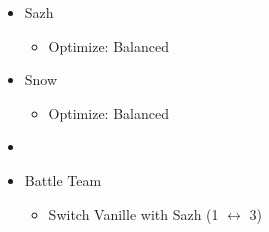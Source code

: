 \begin{menu}
\begin{itemize}
\begin{itemize}
\begin{itemize}
				      \end{itemize}
				\item Sazh
				      \begin{itemize}
					      \item Optimize: Balanced
				      \end{itemize}
				\item Snow
				      \begin{itemize}
					      \item Optimize: Balanced
				      \end{itemize}
			\end{itemize}
			\paradigm
			\begin{itemize}
			
					      \item {}%
					            {\paradigmline{\rav}{\rav}{\syn}}%
					            {\paradigmline[2]{\textit{(\rav)}}{\textit{\com}}{\textit{\com}}}%
					            {\paradigmline{(\med)}{\sen}{(\sen)}}%
					            {\paradigmline{\med}{\com}{\com}}%
					            {\paradigmline{\sab}{\rav}{\rav}}%
					            {\paradigmline{\rav}{\rav}{\rav}}
				\item Battle Team
				      \begin{itemize}
					      \item Switch Vanille with Sazh (1 $\leftrightarrow$ 3)
				      \end{itemize}
			\end{itemize}
		\end{itemize}
	\end{menu}
	\vfill
	\renewcommand{\fourth}{[4] Tireless Charge (\com/\com/\med)}
	\renewcommand{\second}{[2] Aggression (\com/\com/\rav)}
	\renewcommand{\third}{[3] Consolidation (\sen/\sen/\med)}
	\renewcommand{\first}{[1] Malevolence (\syn/\rav/\rav)}
	\renewcommand{\fifth}{[5] Smart Bomb (\rav/\rav/\sab)}
	\renewcommand{\sixth}{[6] Tri-Disaster (\rav/\rav/\rav)}
